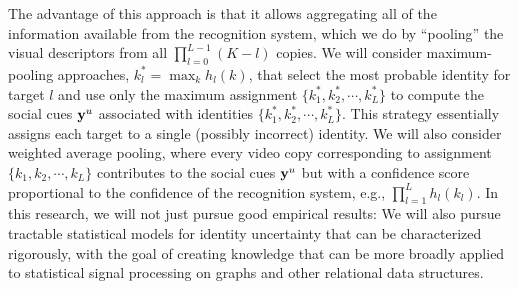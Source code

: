The advantage of this approach is that it allows aggregating all of the information available from the recognition system, which we do by ``pooling'' the visual descriptors from all $\prod_{l=0}^{L-1}(K-l)$ copies. We will consider maximum-pooling approaches, $k_l^{*}=\max_{k}h_l(k)$, that select the most probable identity for target $l$ and use only the maximum assignment $\{k_1^{*}, k_2^{*}, \cdots, k_L^{*}\}$ to compute the social cues ${\bf y}^u$ associated with identities $\{k_1^{*}, k_2^{*}, \cdots, k_L^{*}\}$. This strategy essentially assigns each target to a single (possibly incorrect) identity. We will also consider weighted average pooling, where every video copy corresponding to assignment $\{k_1, k_2, \cdots, k_L\}$ contributes to the social cues ${\bf y}^u$ but with a confidence score proportional to the confidence of the recognition system, e.g., $\prod_{l=1}^{L}h_l(k_l)$. In this research, we will not just pursue good empirical results: We will also pursue tractable statistical models for identity uncertainty that can be characterized rigorously, with the goal of creating knowledge that can be more broadly applied to statistical signal processing on graphs and other relational data structures.




